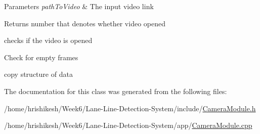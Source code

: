 \begin{DoxyParams}{Parameters}
{\em path\+To\+Video} & The input video link\\
\hline
\end{DoxyParams}
\begin{DoxyReturn}{Returns}
number that denotes whether video opened 
\end{DoxyReturn}
checks if the video is opened

Check for empty frames

copy structure of data 

The documentation for this class was generated from the following files\+:\begin{DoxyCompactItemize}
\item 
/home/hrishikesh/\+Week6/\+Lane-\/\+Line-\/\+Detection-\/\+System/include/\mbox{\hyperlink{_camera_module_8h}{Camera\+Module.\+h}}\item 
/home/hrishikesh/\+Week6/\+Lane-\/\+Line-\/\+Detection-\/\+System/app/\mbox{\hyperlink{_camera_module_8cpp}{Camera\+Module.\+cpp}}\end{DoxyCompactItemize}
